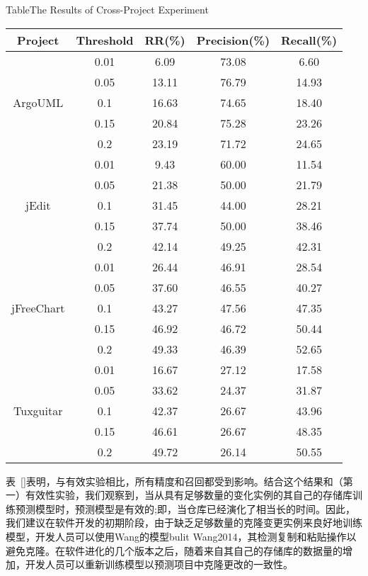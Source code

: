 {\begin{table}[htbp]
{Table$\!$}{The Results of Cross-Project Experiment}
\vspace{0.5em}
\centering
\wuhao
\begin{tabular}{ccccc}
\toprule[1.5pt]
{\textbf{Project}}&{\textbf{Threshold}}&{\textbf{RR(\%)}}&{\textbf{Precision(\%)}}&{\textbf{Recall(\%)}}\\
\midrule[1pt]
\multirow{5}{*}{ArgoUML}
&0.01&	6.09&	73.08&	6.60\\
&0.05&	13.11&	76.79&	14.93\\
&0.1&	16.63&	74.65&	18.40\\
&0.15&	20.84&	75.28&	23.26\\
&0.2&	23.19&	71.72&	24.65\\
\hline
\multirow{5}{*}{jEdit}
&0.01&	9.43&	60.00&	11.54\\
&0.05&	21.38&	50.00&	21.79\\
&0.1&	31.45&	44.00&	28.21\\
&0.15&	37.74&	50.00&	38.46\\
&0.2&	42.14&	49.25&	42.31\\
\hline
\multirow{5}{*}{jFreeChart}
&0.01&	26.44&	46.91&	28.54\\
&0.05&	37.60&	46.55&	40.27\\
&0.1&	43.27&	47.56&	47.35\\
&0.15&	46.92&	46.72&	50.44\\
&0.2&	49.33&	46.39&	52.65\\
\hline
\multirow{5}{*}{Tuxguitar}
&0.01&	16.67&	27.12&	17.58\\
&0.05&	33.62&	24.37&	31.87\\
&0.1&	42.37&	26.67&	43.96\\
&0.15&	46.61&	26.67&	48.35\\
&0.2&	49.72&	26.14&	50.55\\
\bottomrule[1.5pt]
\end{tabular}
\end{table}

表~\ref{}表明，与有效实验相比，所有精度和召回都受到影响。结合这个结果和（第一）有效性实验，我们观察到，当从具有足够数量的变化实例的其自己的存储库训练预测模型时，预测模型是有效的;即，当仓库已经演化了相当长的时间。因此，我们建议在软件开发的初期阶段，由于缺乏足够数量的克隆变更实例来良好地训练模型，开发人员可以使用Wang的模型bulit  \cite{} { Wang2014}，其检测复制和粘贴操作以避免克隆。在软件进化的几个版本之后，随着来自其自己的存储库的数据量的增加，开发人员可以重新训练模型以预测项目中克隆更改的一致性。

}
